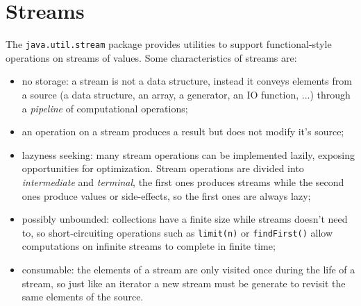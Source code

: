 \section{Streams}
The \verb|java.util.stream| package provides utilities to support functional-style operations on streams of values.
Some characteristics of streams are:
\begin{itemize}
    \item no storage: a stream is not a data structure, instead it conveys elements from a source (a data structure, an array, a generator, an IO function, ...) through a \emph{pipeline} of computational operations;
    
    \item an operation on a stream produces a result but does not modify it's source;
    
    \item lazyness seeking: many stream operations can be implemented lazily, exposing opportunities for optimization. Stream operations are divided into \emph{intermediate} and \emph{terminal}, the first ones produces streams while the second ones produce values or side-effects, so the first ones are always lazy;

    \item possibly unbounded: collections have a finite size while streams doesn't need to, so short-circuiting operations such as \verb|limit(n)| or \verb|findFirst()| allow computations on infinite streams to complete in finite time;

    \item consumable: the elements of a stream are only visited once during the life of a stream, so just like an iterator a new stream must be generate to revisit the same elements of the source.
\end{itemize}

